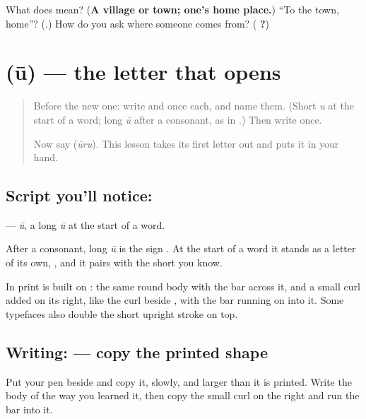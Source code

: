 \begin{tcolorbox}[breakable,colback=teal!4,colframe=teal!35!black,title={Before you move on}]
What does \textbf{} mean? (\textbf{A village or town; one's home place.}) \textquotedblleft{}To the town, home\textquotedblright{}? (\textbf{}.) How do you ask where someone comes from? (\textbf{  ?})
\end{tcolorbox}
\section[\texorpdfstring{\te{ఊ} (ū)}{ఊ (ū)}]{ (ū) — the letter that opens }

\label{lesson:TE-S176-letter-uu}



\begin{quote}
Before the new one: write \textbf{} and \textbf{} once each, and name them. (Short \emph{u} at the start of a word; long \emph{ū} after a consonant, as in \textbf{}.) Then write \textbf{} once.

Now say \textbf{} (\emph{ūru}). This lesson takes its first letter out and puts it in your hand.
\end{quote}

\subsection*{Script you'll notice: }
\textbf{} — \emph{ū}, a long \emph{ū} at the start of a word.

After a consonant, long \emph{ū} is the sign \textbf{}. At the start of a word it stands as a letter of its own, \textbf{}, and it pairs with the short \textbf{} you know.

In print \textbf{} is built on \textbf{}: the same round body with the bar across it, and a small curl added on its right, like the curl beside \textbf{}, with the bar running on into it. Some typefaces also double the short upright stroke on top.

\subsection*{Writing:  — copy the printed shape}
Put your pen beside \textbf{} and copy it, slowly, and larger than it is printed. Write the body of \textbf{} the way you learned it, then copy the small curl on the right and run the bar into it.

